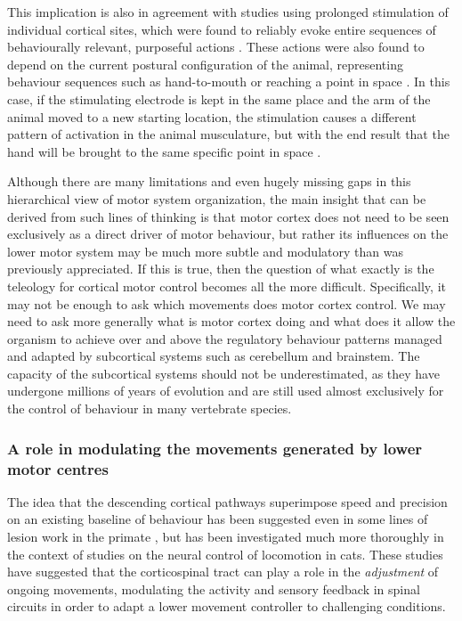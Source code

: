 This implication is also in agreement with studies using prolonged stimulation of individual cortical sites, which were found to reliably evoke entire sequences of behaviourally relevant, purposeful actions \cite{Ferrier1873,Clark1937,Graziano2002}. These actions were also found to depend on the current postural configuration of the animal, representing behaviour sequences such as hand-to-mouth or reaching a point in space \cite{Graziano2002}. In this case, if the stimulating electrode is kept in the same place and the arm of the animal moved to a new starting location, the stimulation causes a different pattern of activation in the animal musculature, but with the end result that the hand will be brought to the same specific point in space \cite{Graziano2002}.

Although there are many limitations and even hugely missing gaps in this hierarchical view of motor system organization, the main insight that can be derived from such lines of thinking is that motor cortex does not need to be seen exclusively as a direct driver of motor behaviour, but rather its influences on the lower motor system may be much more subtle and modulatory than was previously appreciated. If this is true, then the question of what exactly is the teleology for cortical motor control becomes all the more difficult. Specifically, it may not be enough to ask which movements does motor cortex control. We may need to ask more generally what is motor cortex doing and what does it allow the organism to achieve over and above the regulatory behaviour patterns managed and adapted by subcortical systems such as cerebellum and brainstem. The capacity of the subcortical systems should not be underestimated, as they have undergone millions of years of evolution and are still used almost exclusively for the control of behaviour in many vertebrate species.

\subsubsection*{A role in modulating the movements generated by lower motor centres}

The idea that the descending cortical pathways superimpose speed and precision on an existing baseline of behaviour has been suggested even in some lines of lesion work in the primate \cite{Lawrence1968a}, but has been investigated much more thoroughly in the context of studies on the neural control of locomotion in cats. These studies have suggested that the corticospinal tract can play a role in the \emph{adjustment} of ongoing movements, modulating the activity and sensory feedback in spinal circuits in order to adapt a lower movement controller to challenging conditions.

